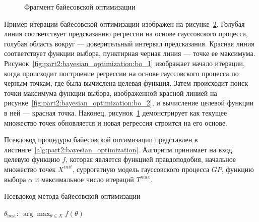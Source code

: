 \begin{figure}[b]
\begin{subfigure}{.31\textwidth}
      \caption{}
      \label{fig:part2:bayesian_optimization:bo_3}
    \end{subfigure}
    \caption{Фрагмент байесовской оптимизации}
    \label{fig:part2:bayesian_optimization:bo}
\end{figure}

Пример итерации байесовской оптимизации изображен на рисунке~\ref{fig:part2:bayesian_optimization:bo}.
Голубая линия соответствует предсказанию регрессии на основе гауссовского процесса, голубая область вокруг --- доверительный интервал предсказания.
Красная линия соответствует функции выбора, пунктирная черная линия --- точке ее максимума.
Рисунок~\ref{fig:part2:bayesian_optimization:bo_1} изображает начало итерации, когда происходит построение регрессии на основе гауссовского процесса по черным точкам, где была вычислена целевая функция.
Затем происходит поиск точки максимума функции выбора, изображенной красной линией на рисунке~\ref{fig:part2:bayesian_optimization:bo_2}, и вычисление целевой функции в ней --- красная точка. 
Наконец, рисунок~\ref{fig:part2:bayesian_optimization:bo_3} демонстрирует как текущее множество точек обновляется и новая регрессия строится на его основе.

Псевдокод процедуры байесовской оптимизации представлен в листинге~\ref{alg:part2:bayesian_optimization}.
Алгоритм принимает на вход целевую функцию $f$, которая является функцией правдоподобия, начальное множество точек $X^{init}$, суррогатную модель гауссовского процесса $GP$, функцию выбора $\alpha$ и максимальное число итераций $T^{max}$.

\begin{algorithm}[ht]
\caption{Псевдокод метода байесовской оптимизации}
\label{alg:part2:bayesian_optimization}
\begin{algorithmic}[1]
    \EndWhile
\State \Return $\theta_{\text{best}}:\ \arg\max_{\theta \in X} f(\theta)$
\EndFunction
\end{algorithmic}
\end{algorithm}


